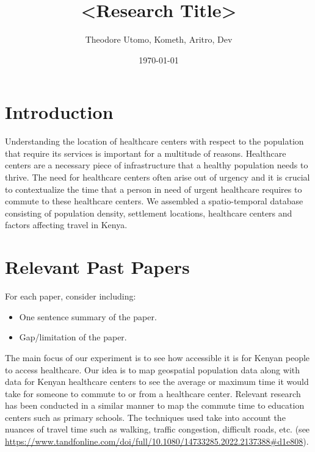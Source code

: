 \documentclass[11pt]{article}
\title{<Research Title>}
\author{Theodore Utomo, Kometh, Aritro, Dev}
\date{\today}
\begin{document}
\maketitle

\section{Introduction}
Understanding the location of healthcare centers with respect to the population that require its services is important for a multitude of reasons. Healthcare centers are a necessary piece of infrastructure that a healthy population needs to thrive. The need for healthcare centers often arise out of urgency and it is crucial to contextualize the time that a person in need of urgent healthcare requires to commute to these healthcare centers. We assembled a spatio-temporal database consisting of population density, settlement locations, healthcare centers and factors affecting travel in Kenya.

\section{Relevant Past Papers}
For each paper, consider including:
\begin{itemize}
    \item One sentence summary of the paper.
    \item Gap/limitation of the paper.
\end{itemize}
The main focus of our experiment is to see how accessible it is for Kenyan people to access healthcare. Our idea is to map geospatial population data along with data for Kenyan healthcare centers to see the average or maximum time it would take for someone to commute to or from a healthcare center. Relevant research has been conducted in a similar manner to map the commute time to education centers such as primary schools. The techniques used take into account the nuances of travel time such as walking, traffic congestion, difficult roads, etc. (see \url{https://www.tandfonline.com/doi/full/10.1080/14733285.2022.2137388#d1e808}).
\end{document}
